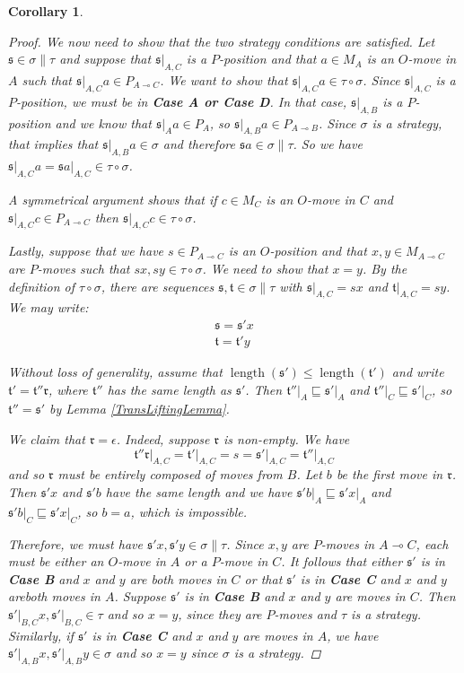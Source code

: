\documentclass[11pt]{article} %
\theoremstyle{plain} %
\newtheorem{corollary}[theorem]{Corollary}
\theoremstyle{definition} %
\theoremstyle{note}
\theoremstyle{exercisestyle}
\renewcommand{\implies}{\multimap}
\newcommand{\comp}[2]{#1 \circ #2}
\newcommand{\s}{\mathfrak s}
\renewcommand{\t}{\mathfrak t}
\newcommand{\emptyplay}{\epsilon}
\newcommand{\prefix}{\sqsubseteq}
\DeclareMathOperator{\length}{length}
\renewcommand{\r}{\mathfrak r}
\begin{document}
\begin{corollary}
\begin{proof}
    We now need to show that the two strategy conditions are satisfied.  Let $\s\in\sigma\|\tau$ and suppose that $\s\vert_{A,C}$ is a $P$-position and that $a\in M_A$ is an $O$-move in $A$ such that $\s\vert_{A,C}a \in P_{A\implies C}$.  We want to show that $\s\vert_{A,C}a\in \comp\tau\sigma$.  Since $\s\vert_{A,C}$ is a $P$-position, we must be in \textbf{Case A or Case D}.  In that case, $\s\vert_{A,B}$ is a $P$-position and we know that $\s\vert_Aa\in P_A$, so $\s\vert_{A,B}a\in P_{A\implies B}$.  Since $\sigma$ is a strategy, that implies that $\s\vert_{A,B}a\in\sigma$ and therefore $\s a\in\sigma\|\tau$.  So we have $\s\vert_{A,C}a=\s a\vert_{A,C}\in\comp\tau\sigma$.

    A symmetrical argument shows that if $c\in M_C$ is an $O$-move in $C$ and $\s\vert_{A,C}c\in P_{A\implies C}$ then $\s\vert_{A,C}c\in\comp\tau\sigma$.  

    Lastly, suppose that we have $s\in P_{A\implies C}$ is an $O$-position and that $x,y\in M_{A\implies C}$ are $P$-moves such that $sx,sy\in\comp\tau\sigma$.  We need to show that $x=y$.  By the definition of $\comp\tau\sigma$, there are sequences $\s,\t\in\sigma\|\tau$ with $\s\vert_{A,C}=sx$ and $\t\vert_{A,C}=sy$.  We may write:
    \begin{gather*}
      \s = \s'x \\
      \t = \t'y
    \end{gather*}

    Without loss of generality, assume that $\length(\s')\le\length(\t')$ and write $\t'=\t''\r$, where $\t''$ has the same length as $\s'$.  Then $\t''\vert_A\prefix\s'\vert_A$ and $\t''\vert_C\prefix\s'\vert_C$, so $\t''=\s'$ by Lemma \ref{TransLiftingLemma}.  

    We claim that $\r=\emptyplay$.  Indeed, suppose $\r$ is non-empty.  We have
    \[
      \t''\r\vert_{A,C}=\t'\vert_{A,C}=s=\s'\vert_{A,C}=\t''\vert_{A,C}
      \]
    and so $\r$ must be entirely composed of moves from $B$.  Let $b$ be the first move in $\r$.  Then $\s'x$ and $\s'b$ have the same length and we have $\s'b\vert_A\prefix\s'x\vert_A$ and $\s'b\vert_C\prefix\s'x\vert_C$, so $b=a$, which is impossible.  

    Therefore, we must have $\s'x, \s'y\in\sigma\|\tau$.  Since $x,y$ are $P$-moves in $A\implies C$, each must be either an $O$-move in $A$ or a $P$-move in $C$.  It follows that either $\s'$ is in \textbf{Case B} and $x$ and $y$ are both moves in $C$ or that $\s'$ is in \textbf{Case C} and $x$ and $y$ areboth moves in $A$.  Suppose $\s'$ is in \textbf{Case B} and $x$ and $y$ are moves in $C$.  Then $\s'\vert_{B,C}x,\s'\vert_{B,C}\in\tau$ and so $x=y$, since they are $P$-moves and $\tau$ is a strategy.  Similarly, if $\s'$ is in \textbf{Case C} and $x$ and $y$ are moves in $A$, we have $\s'\vert_{A,B}x,\s'\vert_{A,B}y\in\sigma$ and so $x=y$ since $\sigma$ is a strategy.
  \end{proof}
\end{corollary}
\end{document}
